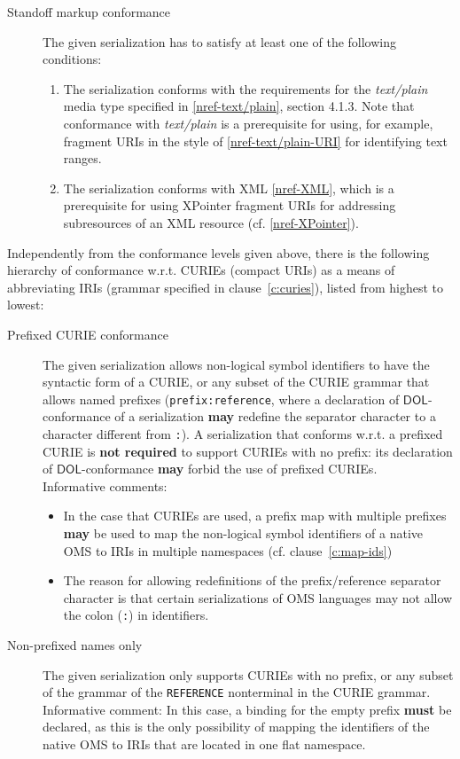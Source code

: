 \documentclass[10pt, a4paper]{isov2}
\makeatletter
\newcommand*{\cf}{cf.\@\xspace}
\newcommand*{\wrt}{w.r.t.\@\xspace}
\newcommand*\CommentAuthor{}
\renewcommand*\CommentAuthor{#1}}
\newcommand*\CommentDate{}
\renewcommand*\CommentDate{#1}}
\newcommand*\CommentId{}
\renewcommand*\CommentId{#1}}
\newcommand*\CommentType{}
\renewcommand*\CommentType{#1}}
\newcommand*{\SetCommentColorByType}[1]{%
\edef\localType{{#1}}%
\expandafter\ifstrequal\localType{q-aut}{\colorlet{CommentColor}{red}}{%
\expandafter\ifstrequal\localType{q-all}{\colorlet{CommentColor}{orange}}{%
\expandafter\ifstrequal\localType{todo}{\colorlet{CommentColor}{orange}}{%
\expandafter\ifstrequal\localType{fyi}{\colorlet{CommentColor}{lightgray}}{%
\colorlet{CommentColor}{yellow}}}}}}
\newcommand*{\SetCommentPrefixByType}[1]{%
\edef\localType{{#1}}%
\expandafter\@ifmtarg\localType{%
\edef\CommentPrefix{}%
}{%
\caseupper[q]{#1}%
\edef\CommentPrefix{\thestring: }%
}}
\newcommand*{\initComment}[1]{%
\setkeys{Comment}{#1}%
\SetCommentColorByType{\CommentType}%
\relax%
\SetCommentPrefixByType{\CommentType}%
\relax%
}
\newcommand*{\todonote}[2][]{%
\initComment{#1}%
\pdfcomment[author=\CommentAuthor,color=CommentColor,date=\CommentDate,id=\CommentId]{%
\CommentPrefix
#2}}
\renewcommand*{\todonote}[2][]{%
\initComment{#1}%
\ednote{\CommentPrefix #2}}
\newcommand*{\mimetype}[1]{\textit{#1}}
\newcommand*{\syntax}[1]{\texttt{#1}}
\newcommand*{\notrequired}{\textbf{not required}\xspace}
\newcommand*{\may}{\textbf{may}\xspace}
\newcommand*{\hasto}{\textbf{must}\xspace}
\newcommand*{\DOL}{\ensuremath{\mathsf{DOL}}\xspace}
\renewcommand{\clauserefname}{clause}
\renewcommand{\noterefname}{note}
\renewcommand{\cref}[1]{\clauserefname~\ref{#1}}
\renewcommand{\nref}[1]{\noterefname~\ref{#1}}
\renewcommand{\nref}[1]{\ref{nref-#1}}
\makeatother
\begin{document}
\begin{description}
\item[Standoff markup conformance]
The given serialization has to satisfy at least one of the following conditions:
\begin{enumerate}
\item\label{it:standoff-text-plain} The serialization conforms with the requirements for the \mimetype{text/plain} media type specified in \nref{text/plain}, section 4.1.3.
Note that conformance with \mimetype{text/plain} is a prerequisite for using, for
example, fragment URIs in the style of \nref{text/plain-URI} for identifying text ranges.
\item\label{it:standoff-xpointer} The serialization conforms with XML \nref{XML}, which is a prerequisite for using XPointer fragment URIs for addressing subresources of an XML resource (cf. \nref{XPointer}).
\end{enumerate}
\end{description}


Independently from the conformance levels given above, there is the following hierarchy of conformance \wrt CURIEs (compact URIs) as a means of abbreviating IRIs (grammar specified in \cref{c:curies}), listed from highest to lowest:
\begin{description}
\item[Prefixed CURIE conformance] The given serialization allows non-logical symbol identifiers to have the syntactic form of a CURIE, or any subset of the CURIE grammar that allows named prefixes (\syntax{prefix:reference}, where a declaration of \DOL-conformance of a serialization \may redefine the separator character to a character different from \syntax{:}).  A serialization that conforms \wrt a prefixed CURIE  is \notrequired to support CURIEs with no prefix: its declaration of \DOL-conformance \may forbid the use of prefixed CURIEs.\\
  Informative comments:
  \begin{itemize}
  \item In the case that CURIEs are used, a prefix map with multiple prefixes \may be used to map the non-logical symbol identifiers of a native OMS to IRIs in multiple namespaces (\cf \cref{c:map-ids})
  \item The reason for allowing redefinitions of the prefix/reference separator character is that certain serializations of OMS languages may not allow the colon (\syntax{:}) in identifiers.
  \end{itemize}
\item[Non-prefixed names only] The given serialization only supports CURIEs with no prefix, or any subset of the grammar of the \syntax{REFERENCE} nonterminal in the CURIE grammar.\\
  Informative comment: In this case, a binding for the empty prefix \hasto be declared, as this is the only possibility of mapping the identifiers of the native OMS to IRIs that are located in one flat namespace.
\end{description}
\end{document}
